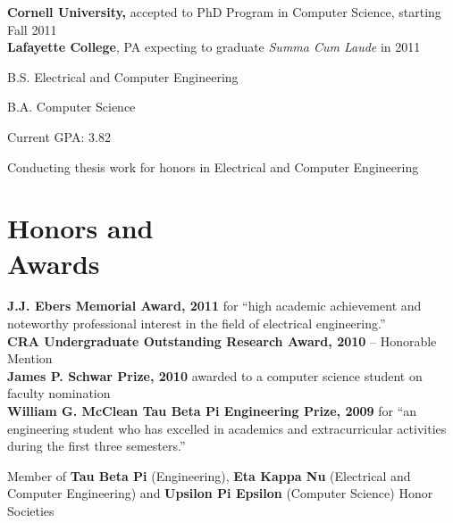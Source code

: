 \documentclass[margin,line]{resume}
\begin{document}
\begin{resume}
    {\bf Cornell University,} accepted to PhD Program in Computer Science,
    starting Fall 2011 \\
    {\bf Lafayette College}, PA \vspace{2mm} expecting to graduate \emph{Summa Cum Laude} in 2011%
      \begin{list2}
        \item B.S. Electrical and Computer Engineering
        \item B.A. Computer Science
        \item Current GPA: 3.82
        \item Conducting thesis work for honors in Electrical and Computer Engineering
    \end{list2}
    \section{\mysidestyle Honors and\\Awards} 

    {\bf J.J. Ebers Memorial Award, 2011} for ``high academic achievement and noteworthy professional
    interest in the field of electrical engineering.''\\
    {\bf CRA Undergraduate Outstanding Research Award, 2010} -- Honorable Mention \\
    {\bf James P. Schwar Prize, 2010} awarded to a computer science student on faculty nomination \\
    {\bf William G. McClean Tau Beta Pi Engineering Prize, 2009} for ``an engineering student who has excelled in academics and extracurricular activities during the first three semesters.''
    
    Member of {\bf Tau Beta Pi} (Engineering), {\bf Eta Kappa Nu} (Electrical and Computer Engineering)
    and {\bf Upsilon Pi Epsilon} (Computer Science) Honor Societies
    
    

\end{resume}
\end{document}
